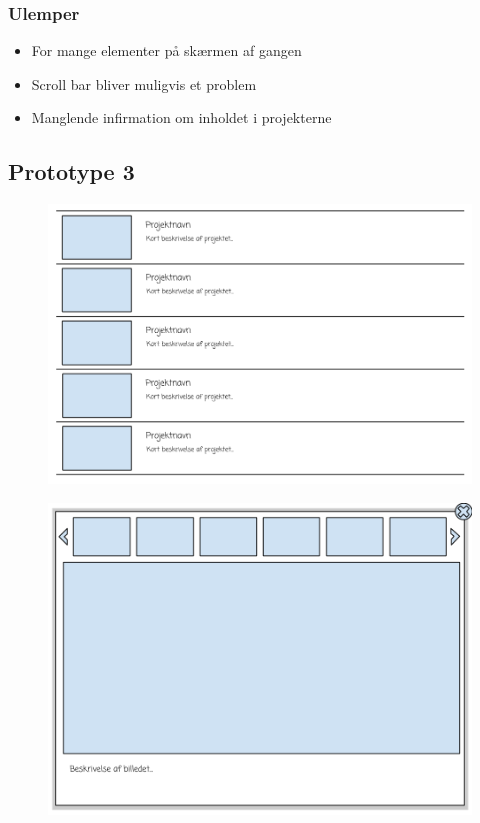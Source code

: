 \documentclass[a4paper,titlepage,fleqn,12pt]{article}
\begin{document}
\subsubsection{Ulemper}
\begin{itemize}
	\item For mange elementer på skærmen af gangen
	\item Scroll bar bliver muligvis et problem
	\item Manglende infirmation om inholdet i projekterne
\end{itemize}

\subsection{Prototype 3}

\begin{figure}[H]
	\includegraphics[width=\textwidth]{Sketch2_1.png}
\end{figure}

\begin{figure}[H]
	\includegraphics[width=\textwidth]{Sketch2_2.png}
\end{figure}
\end{document}
